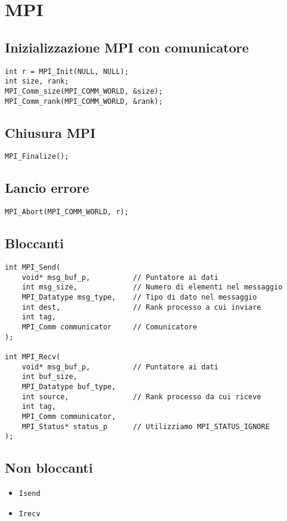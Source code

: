 \documentclass{article}
\begin{document}
\section{MPI}

\subsection{Inizializzazione MPI con comunicatore}
\begin{verbatim}
int r = MPI_Init(NULL, NULL);
int size, rank;
MPI_Comm_size(MPI_COMM_WORLD, &size);
MPI_Comm_rank(MPI_COMM_WORLD, &rank);
\end{verbatim}

\subsection{Chiusura MPI}
\begin{verbatim}
MPI_Finalize();
\end{verbatim}

\subsection{Lancio errore}
\begin{verbatim}
MPI_Abort(MPI_COMM_WORLD, r);
\end{verbatim}

\subsection{Bloccanti}
\begin{verbatim}
int MPI_Send(
    void* msg_buf_p,          // Puntatore ai dati
    int msg_size,             // Numero di elementi nel messaggio
    MPI_Datatype msg_type,    // Tipo di dato nel messaggio
    int dest,                 // Rank processo a cui inviare
    int tag,
    MPI_Comm communicator     // Comunicatore
);

int MPI_Recv(
    void* msg_buf_p,          // Puntatore ai dati
    int buf_size,
    MPI_Datatype buf_type,
    int source,               // Rank processo da cui riceve
    int tag,
    MPI_Comm communicator,
    MPI_Status* status_p      // Utilizziamo MPI_STATUS_IGNORE
);
\end{verbatim}

\subsection{Non bloccanti}
\begin{itemize}
    \item \texttt{Isend}
    \item \texttt{Irecv}
\end{itemize}
\end{document}
